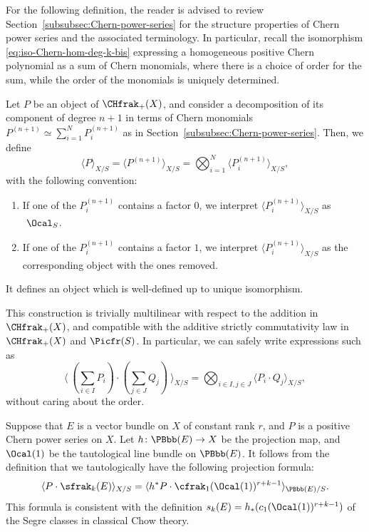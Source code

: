 For the following definition, the reader is advised to review Section~\ref{subsubsec:Chern-power-series} for the structure properties of Chern power series and the associated terminology. In particular, recall the isomorphism \eqref{eq:iso-Chern-hom-deg-k-bis} expressing a homogeneous positive Chern polynomial as a sum of Chern monomials, where there is a choice of order for the sum, while the order of the monomials is uniquely determined.

\begin{definition}\label{def:Elkik-intersection-Chern-power}
Let $P$ be an object of $\CHfrak_{+}(X)$, and consider a decomposition of its component of degree $n+1$ in terms of Chern monomials $P^{(n+1)}\simeq\sum_{i=1}^{N}P_{i}^{(n+1)}$ as in Section~\ref{subsubsec:Chern-power-series}. Then, we define
\begin{displaymath}
\langle P\rangle_{X/S}=\langle P^{(n+1)}\rangle_{X/S}=\bigotimes_{i=1}^{N}\langle P_{i}^{(n+1)}\rangle_{X/S},
\end{displaymath}
with the following convention:
\begin{enumerate}
\item If one of the $P_{i}^{(n+1)}$ contains a factor $0$, we interpret $\langle P_{i}^{(n+1)} \rangle_{X/S} $ as $\ \Ocal_S$.
\item If one of the $P_{i}^{(n+1)}$ contains a factor $1$, we interpret $\langle P_{i}^{(n+1)} \rangle_{X/S} $ as the corresponding object with the ones removed.
\end{enumerate}
It defines an object which is well-defined up to unique isomorphism.

\end{definition}
This construction is trivially multilinear with respect to the addition in $\CHfrak_{+}(X)$, and compatible with the additive strictly commutativity law in $\CHfrak_{+}(X)$ and $\Picfr(S)$. In particular, we can safely write expressions such as
\begin{displaymath}
\langle\ (\sum_{i\in I} P_{i})\cdot (\sum_{j\in J}Q_{j})\ \rangle_{X/S}=\bigotimes_{i \in I,j \in J}\langle P_{i}\cdot Q_{j}\rangle_{X/S},
\end{displaymath}
without caring about the order.

\begin{remark}\label{rmk:taut-proj-form}
Suppose that $E$ is a vector bundle on $X$ of constant rank $r$, and $P$ is a positive Chern power series on $X$. Let $h\colon\PBbb(E)\to X$ be the projection map, and $\Ocal(1)$ be the tautological line bundle on $\PBbb(E)$. It follows from the definition that we tautologically have the following projection formula:
\begin{displaymath}
\langle P \cdot \sfrak_k(E) \rangle_{X/S} = \langle h^{\ast}P \cdot \cfrak_1(\Ocal(1))^{r+k-1} \rangle_{\PBbb(E)/S}.
\end{displaymath}
This formula is consistent with the definition $s_k(E) = h_\ast (c_1(\Ocal(1))^{r+k-1})$ of the Segre classes in classical Chow theory.
\end{remark}

